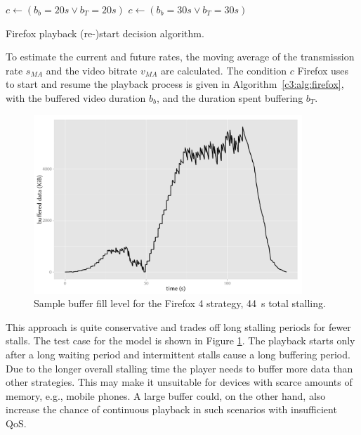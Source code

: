 \begin{algorithm}[htb]
	\centering
	\begin{algorithmic}
		\STATE $c \gets ( b_b=20s \lor b_T=20s )$
	\ELSE
		\STATE $c \gets ( b_b=30s \lor b_T=30s )$
	\ENDIF
	\end{algorithmic}
	\caption{Firefox playback (re-)start decision algorithm.}
\label{c3:alg:firefox}
\end{algorithm}

To estimate the current and future rates, the moving average of the transmission rate $s_{MA}$ and the video bitrate $v_{MA}$ are calculated. The condition $c$ Firefox uses to start and resume the playback process is given in Algorithm~\ref{c3:alg:firefox}, with the buffered video duration $b_b$, and the duration spent buffering $b_T$.

 \begin{figure}[htb]
	\centering
	\includegraphics[width=0.9\textwidth]{images/R-bufferlevel-firefox.pdf}
	\caption{Sample buffer fill level for the Firefox 4 strategy, \SI{44}{\second} total stalling.}
\label{c3:fig:bufferlevel-firefox}
\end{figure}

This approach is quite conservative and trades off long stalling periods for fewer stalls. The test case for the model is shown in Figure \ref{c3:fig:bufferlevel-firefox}. The playback starts only after a long waiting period and intermittent stalls cause a long buffering period. Due to the longer overall stalling time the player needs to buffer more data than other strategies. This may make it unsuitable for devices with scarce amounts of memory, e.g., mobile phones. A large buffer could, on the other hand, also increase the chance of continuous playback in such scenarios with insufficient \gls{QoS}.


